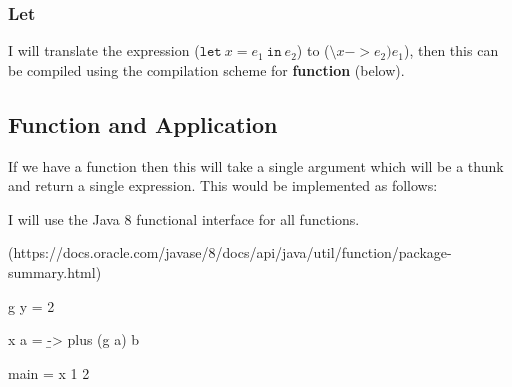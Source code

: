 \documentclass[12pt,a4paper,twoside]{article}
\begin{document}
\subsubsection{Let} 

I will translate the expression ($\mathtt{let}\ x = e_1\ \mathtt{in}\ e_2$) to 
($\texttt{\textbackslash} x -> e_2)e_1$), then 
this can be compiled using the compilation scheme for \textbf{function} (below).

\subsection{Function and Application}

If we have a function then this will take a single argument which will be a thunk and return a single expression. 
This would be implemented as follows:

I will use the Java 8 functional interface for all functions.

(https://docs.oracle.com/javase/8/docs/api/java/util/function/package-summary.html)

\begin{HaskellLst}
g y = 2
  
x a = \b -> plus (g a) b

main = x 1 2
\end{HaskellLst}
\end{document}
